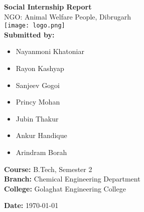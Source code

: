\documentclass[a4paper,12pt]{article}
\begin{document}
\begin{titlepage}
\begin{tcolorbox}[colback=blue!5!white, colframe=blue!80!black, width=\textwidth, arc=4mm, boxrule=1pt, title=Social Internship Report]

\begin{center}
    {\Huge \bfseries Social Internship Report}\\[2ex]
    {\LARGE NGO: Animal Welfare People, Dibrugarh}\\[2ex]
    \texttt{[image: logo.png]}\\[1ex]

    \vspace{2em}
    \textbf{\Large Submitted by:}

    \begin{itemize}
        \item Nayanmoni Khatoniar
        \item Rayon Kashyap
        \item Sanjeev Gogoi
        \item Princy Mohan
        \item Jubin Thakur
        \item Ankur Handique
        \item Arindram Borah
    \end{itemize}

    \vspace{2em}
    \textbf{Course:} B.Tech, Semester 2\\
    \textbf{Branch:} Chemical Engineering Department\\
    \textbf{College:} Golaghat Engineering College

    \vfill
    \textbf{Date:} \today
\end{center}

\end{tcolorbox}
\end{titlepage}
\end{document}
